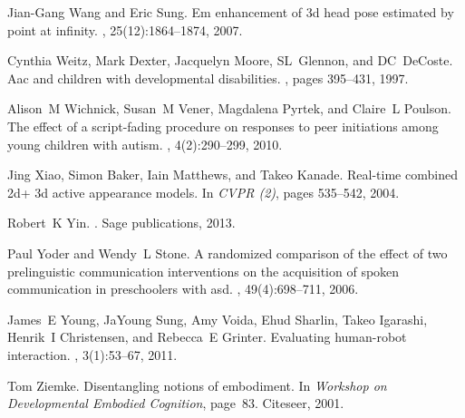 \documentclass{ut-thesis}
\begin{document}
\begin{thebibliography}{100}
Jian-Gang Wang and Eric Sung.
\newblock Em enhancement of 3d head pose estimated by point at infinity.
, 25(12):1864--1874, 2007.

Cynthia Weitz, Mark Dexter, Jacquelyn Moore, SL~Glennon, and DC~DeCoste.
\newblock Aac and children with developmental disabilities.
, pages
  395--431, 1997.

Alison~M Wichnick, Susan~M Vener, Magdalena Pyrtek, and Claire~L Poulson.
\newblock The effect of a script-fading procedure on responses to peer
  initiations among young children with autism.
, 4(2):290--299, 2010.

Jing Xiao, Simon Baker, Iain Matthews, and Takeo Kanade.
\newblock Real-time combined 2d+ 3d active appearance models.
\newblock In {\em CVPR (2)}, pages 535--542, 2004.

Robert~K Yin.
.
\newblock Sage publications, 2013.

Paul Yoder and Wendy~L Stone.
\newblock A randomized comparison of the effect of two prelinguistic
  communication interventions on the acquisition of spoken communication in
  preschoolers with asd.
,
  49(4):698--711, 2006.

James~E Young, JaYoung Sung, Amy Voida, Ehud Sharlin, Takeo Igarashi, Henrik~I
  Christensen, and Rebecca~E Grinter.
\newblock Evaluating human-robot interaction.
, 3(1):53--67, 2011.

Tom Ziemke.
\newblock Disentangling notions of embodiment.
\newblock In {\em Workshop on Developmental Embodied Cognition}, page~83.
  Citeseer, 2001.

\end{thebibliography}


\end{document}

